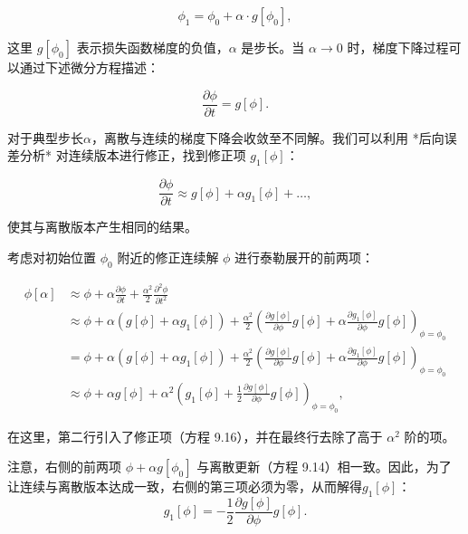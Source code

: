 \begin{equation}
\phi_1 = \phi_0 + \alpha \cdot g[\phi_0], 
\end{equation}

这里 \(g[\phi_0]\) 表示损失函数梯度的负值，\(\alpha\) 是步长。当 \(\alpha \rightarrow 0\) 时，梯度下降过程可以通过下述微分方程描述：

\begin{equation}
\frac{\partial \phi}{\partial t} = g[\phi]. 
\end{equation}

对于典型步长\(\alpha\)，离散与连续的梯度下降会收敛至不同解。我们可以利用 *后向误差分析* 对连续版本进行修正，找到修正项 \(g_1[\phi]\)：

\begin{equation}
\frac{\partial \phi}{\partial t} \approx g[\phi] + \alpha g_1[\phi] + \ldots, 
\end{equation}

使其与离散版本产生相同的结果。

考虑对初始位置  \(\phi_0\) 附近的修正连续解 \(\phi\) 进行泰勒展开的前两项：


\begin{align}
	\phi[\alpha] &\approx \phi + \alpha \frac{\partial \phi}{\partial t} + \frac{\alpha^2}{2} \frac{\partial^2 \phi}{\partial t^2} \\
	&\approx \phi + \alpha (g[\phi] + \alpha g_1[\phi]) + \frac{\alpha^2}{2} \left( \frac{\partial g[\phi]}{\partial \phi} g[\phi] + \alpha \frac{\partial g_1[\phi]}{\partial \phi} g[\phi] \right)_{\phi=\phi_0} \\
	&= \phi + \alpha (g[\phi] + \alpha g_1[\phi]) + \frac{\alpha^2}{2} \left( \frac{\partial g[\phi]}{\partial \phi} g[\phi] + \alpha \frac{\partial g_1[\phi]}{\partial \phi} g[\phi] \right)_{\phi=\phi_0} \\
	&\approx \phi + \alpha g[\phi] + \alpha^2 \left( g_1[\phi] + \frac{1}{2} \frac{\partial g[\phi]}{\partial \phi} g[\phi] \right)_{\phi=\phi_0} , 
\end{align} 

在这里，第二行引入了修正项（方程 9.16），并在最终行去除了高于 \(\alpha^2\) 阶的项。

注意，右侧的前两项 \(\phi + \alpha g[\phi_0]\) 与离散更新（方程 9.14）相一致。因此，为了让连续与离散版本达成一致，右侧的第三项必须为零，从而解得\(g_1[\phi]\)：
\begin{equation}
g_1[\phi] = - \frac{1}{2} \frac{\partial g[\phi]}{\partial \phi} g[\phi]. 
\end{equation}

